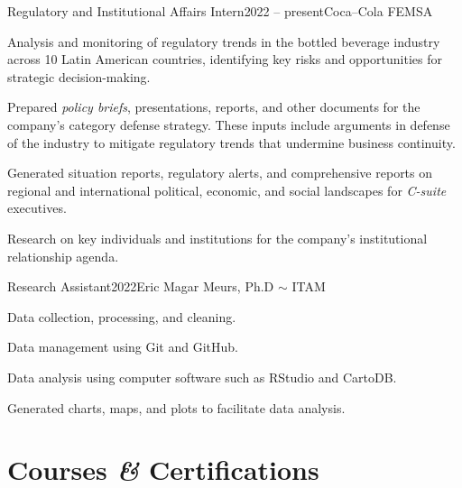 \documentclass[letter]{resume}
\begin{document}
\begin{content}

\begin{position}{Regulatory and Institutional Affairs Intern}{2022 -- present}{Coca--Cola FEMSA}{}{}
  \item Analysis and monitoring of regulatory trends in the bottled beverage industry across 10 Latin American countries, identifying key risks and opportunities for strategic decision-making.
  \item Prepared \emph{policy briefs}, presentations, reports, and other documents for the company's category defense strategy. These inputs include arguments in defense of the industry to mitigate regulatory trends that undermine business continuity.
  \item Generated situation reports, regulatory alerts, and comprehensive reports on regional and international political, economic, and social landscapes for \emph{C-suite} executives.
  \item Research on key individuals and institutions for the company's institutional relationship agenda.
\end{position}

\begin{position}{Research Assistant}{2022}{Eric Magar Meurs, Ph.D $\sim$ ITAM}{}{}
  \item Data collection, processing, and cleaning.
  \item Data management using Git and GitHub.
  \item Data analysis using computer software such as RStudio and CartoDB.
  \item Generated charts, maps, and plots to facilitate data analysis.
\end{position}
\vspace{-.1 \baselineskip}

\sectionlineskip
\end{content}


\section{Courses \textbf{\em\&} Certifications} 
\end{document}

